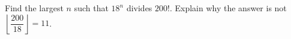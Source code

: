 Find the largest $n$ such that $18^n$ divides $200!$. Explain why the answer is not $\left\lfloor\dfrac{200}{18}\right\rfloor=11$.
